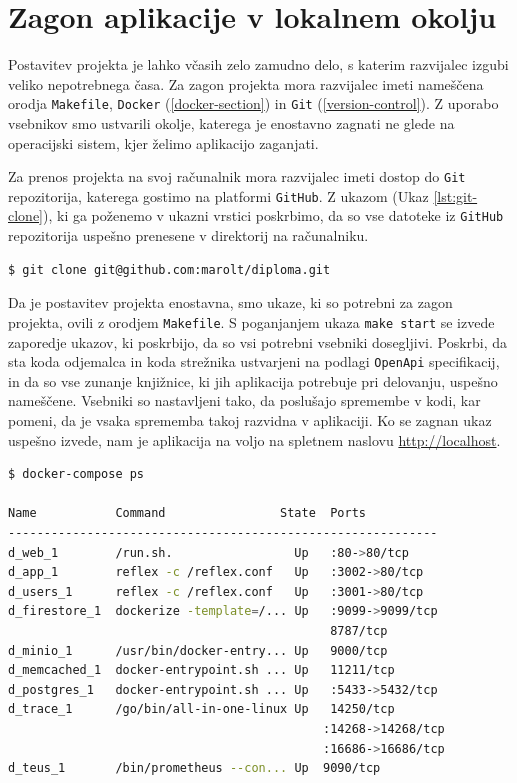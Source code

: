 \documentclass[a4paper, 12pt]{book}
\begin{document}
\section{Zagon aplikacije v lokalnem okolju}
Postavitev projekta je lahko včasih zelo zamudno delo, s katerim razvijalec izgubi veliko nepotrebnega časa. Za zagon projekta mora razvijalec imeti nameščena orodja \verb=Makefile=, \verb=Docker= (\ref{docker-section}) in \verb=Git= (\ref{version-control}). Z uporabo vsebnikov smo ustvarili okolje, katerega je enostavno zagnati ne glede na operacijski sistem, kjer želimo aplikacijo zaganjati.

Za prenos projekta na svoj računalnik mora razvijalec imeti dostop do \verb=Git= repozitorija, katerega gostimo na platformi \verb=GitHub=. Z ukazom (Ukaz \ref{lst:git-clone}), ki ga poženemo v ukazni vrstici poskrbimo, da so vse datoteke iz \verb=GitHub= repozitorija uspešno prenesene v direktorij na računalniku.

\begin{lstlisting}[language=bash,style=mystyle,caption={Ukaz za prenos datotek iz GitHub repozitorija},label=lst:git-clone]
$ git clone git@github.com:marolt/diploma.git
\end{lstlisting}

Da je postavitev projekta enostavna, smo ukaze, ki so potrebni za zagon projekta, ovili z orodjem \verb=Makefile=. S poganjanjem ukaza \verb=make start= se izvede zaporedje ukazov, ki poskrbijo, da so vsi potrebni vsebniki dosegljivi. Poskrbi, da sta koda odjemalca in koda strežnika ustvarjeni na podlagi \verb=OpenApi= specifikacij, in da so vse zunanje knjižnice, ki jih aplikacija potrebuje pri delovanju, uspešno nameščene. Vsebniki so nastavljeni tako, da poslušajo spremembe v kodi, kar pomeni, da je vsaka sprememba takoj razvidna v aplikaciji. Ko se zagnan ukaz uspešno izvede, nam je aplikacija na voljo na spletnem naslovu \url{http://localhost}.


\begin{lstlisting}[language=bash,style=mystyle,caption={Prikaz zagnanih vsebnikov.},label=lst:running-containers]
$ docker-compose ps

Name           Command                State  Ports
------------------------------------------------------------
d_web_1        /run.sh.                 Up   :80->80/tcp
d_app_1        reflex -c /reflex.conf   Up   :3002->80/tcp
d_users_1      reflex -c /reflex.conf   Up   :3001->80/tcp 
d_firestore_1  dockerize -template=/... Up   :9099->9099/tcp             
                                             8787/tcp
d_minio_1      /usr/bin/docker-entry... Up   9000/tcp     
d_memcached_1  docker-entrypoint.sh ... Up   11211/tcp     
d_postgres_1   docker-entrypoint.sh ... Up   :5433->5432/tcp       
d_trace_1      /go/bin/all-in-one-linux Up   14250/tcp 
                                            :14268->14268/tcp
                                            :16686->16686/tcp
d_teus_1       /bin/prometheus --con... Up  9090/tcp     
\end{lstlisting}
\end{document}
